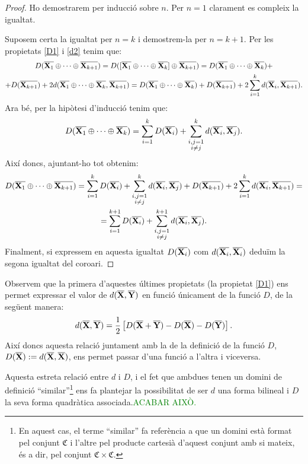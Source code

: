 \documentclass{article}
\theoremstyle{math}
\newcommand{\0}{\ensuremath{\vb{0}}}
\newcommand{\X}{\ensuremath{\vb{X}}}
\newcommand{\Y}{\ensuremath{\vb{Y}}}
\begin{document}
\begin{proof}
    Ho demostrarem per inducció sobre $n$. Per $n=1$ clarament es compleix la igualtat.\par Suposem certa la igualtat per $n=k$ i demostrem-la per $n=k+1$. Per les propietats \ref{D1} i \ref{d2} tenim que:
    \begin{multline*}
        D(\overline{\X_1}\oplus\cdots\oplus\overline{\X_{k+1}})=D([\overline{\X_1}\oplus\cdots\oplus\overline{\X_k}]\oplus\overline{\X_{k+1}})=D(\overline{\X_1}\oplus\cdots\oplus\overline{\X_k})+\\+D(\overline{\X_{k+1}})+2d(\overline{\X_1}\oplus\cdots\oplus\overline{\X_k},\overline{\X_{k+1}})=D(\overline{\X_1}\oplus\cdots\oplus\overline{\X_k})+D(\overline{\X_{k+1}})+2\sum_{i=1}^kd(\overline{\X}_i,\overline{\X_{k+1}}).
    \end{multline*}
    Ara bé, per la hipòtesi d'inducció tenim que:
    $$D(\overline{\X_1}\oplus\cdots\oplus\overline{\X_k})=\sum_{i=1}^kD(\overline{\X_i})+\sum_{\substack{i,j=1\\i\ne j}}^kd(\overline{\X_i},\overline{\X_j}).$$ Així doncs, ajuntant-ho tot obtenim:
    \begin{multline*}
        D(\overline{\X_1}\oplus\cdots\oplus\overline{\X_{k+1}})=\sum_{i=1}^kD(\overline{\X_i})+\sum_{\substack{i,j=1\\i\ne j}}^kd(\overline{\X_i},\overline{\X_j})+D(\overline{\X_{k+1}})+2\sum_{i=1}^kd(\overline{\X_i},\overline{\X_{k+1}})=\\=\sum_{i=1}^{k+1}D(\overline{\X_i})+\sum_{\substack{i,j=1\\i\ne j}}^{k+1}d(\overline{\X_i},\overline{\X_j}).
    \end{multline*}
    Finalment, si expressem en aquesta igualtat $D(\overline{\X_i})$ com $d(\overline{\X_i},\overline{\X_i})$ deduïm la segona igualtat del coro\lgem ari.
\end{proof}
Observem que la primera d'aquestes últimes propietats (la propietat \ref{D1}) ens permet expressar el valor de $d(\overline{\X},\overline{\Y})$ en funció únicament de la funció $D$, de la següent manera: $$d(\overline{\X},\overline{\Y})=\frac{1}{2}\left[D(\overline{\X}+\overline{\Y})-D(\overline{\X})-D(\overline{\Y})\right].$$
Així doncs aquesta relació juntament amb la de la definició de la funció $D$, $D(\overline{\X}):=d(\overline{\X},\overline{\X})$, ens permet passar d'una funció a l'altra i viceversa.\par 
Aquesta estreta relació entre $d$ i $D$, i el fet que ambdues tenen un domini de definició ``similar''\footnote{En aquest cas, el terme ``similar'' fa referència a que un domini està format pel conjunt $\mathfrak{C}$ i l'altre pel producte cartesià d'aquest conjunt amb si mateix, és a dir, pel conjunt $\mathfrak{C}\times\mathfrak{C}$.} ens fa plantejar la possibilitat de ser $d$ una forma bilineal i $D$ la seva forma quadràtica associada.\textcolor{green}{ACABAR AIXÒ.}
\end{document}
